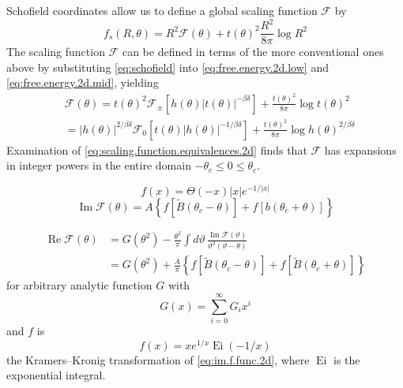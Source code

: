 \documentclass[
  aps,
  pre,
  reprint,
  longbibliography,
  floatfix
]{revtex4-2}
\begin{document}
Schofield coordinates allow us to define a global scaling function $\mathcal F$ by
\begin{equation} \label{eq:schofield.2d.free.energy}
  f_s(R, \theta) = R^2\mathcal F(\theta) + t(\theta)^2\frac{R^2}{8\pi}\log R^2
\end{equation}
The scaling function $\mathcal F$ can be defined in terms of the more
conventional ones above by substituting \eqref{eq:schofield} into \eqref{eq:free.energy.2d.low} and
\eqref{eq:free.energy.2d.mid}, yielding
\begin{equation} \label{eq:scaling.function.equivalences.2d}
  \begin{aligned}
    &\mathcal F(\theta)
    =t(\theta)^2\mathcal F_\pm\left[h(\theta)|t(\theta)|^{-\beta\delta}\right]
      +\frac{t(\theta)^2}{8\pi}\log t(\theta)^2 \\
    &=|h(\theta)|^{2/\beta\delta}\mathcal F_0\left[t(\theta)|h(\theta)|^{-1/\beta\delta}\right]
      +\frac{t(\theta)^2}{8\pi}\log h(\theta)^{2/\beta\delta}
  \end{aligned}
\end{equation}
Examination of \eqref{eq:scaling.function.equivalences.2d} finds that $\mathcal F$ has expansions in integer powers in the entire domain $-\theta_c\leq0\leq\theta_c$.


\begin{equation} \label{eq:im.f.func.2d}
  f(x)=\Theta(-x) |x| e^{-1/|x|}
\end{equation}
\begin{equation}
  \operatorname{Im}\mathcal F(\theta)=A\left\{f\left[\tilde B(\theta_c-\theta)\right]+f\left[b(\theta_c+\theta)\right]\right\}
\end{equation}

\begin{equation}
  \begin{aligned}
    \operatorname{Re}\mathcal F(\theta)
      &=G(\theta^2)-\frac{\theta^2}\pi\int d\vartheta\, \frac{\operatorname{Im}\mathcal F(\vartheta)}{\vartheta^2(\vartheta-\theta)} \\
      &=G(\theta^2)+\frac A\pi\left\{f[\tilde B(\theta_c-\theta)]+f[\tilde B(\theta_c+\theta)]\right\}
  \end{aligned}
\end{equation}
for arbitrary analytic function $G$ with
\begin{equation}
  G(x)=\sum_{i=0}^\infty G_ix^i
\end{equation}
and $f$ is
\begin{equation}
  f(x)=xe^{1/x}\operatorname{Ei}(-1/x)
\end{equation}
the Kramers--Kronig transformation of \eqref{eq:im.f.func.2d}, where $\operatorname{Ei}$ is the exponential integral.
\end{document}
